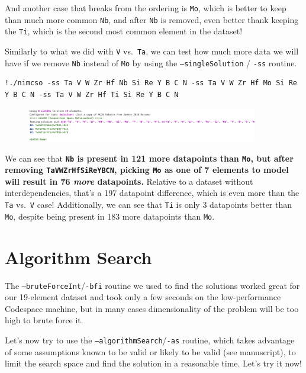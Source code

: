 And another case that breaks from the ordering is
\texttt{Mo}, which is better to keep than much more
common \texttt{Nb}, and after
\texttt{Nb} is removed, even better thank keeping the
\texttt{Ti}, which is the second most common element in
the dataset!

Similarly to what we did with \texttt{V}
vs.~\texttt{Ta}, we can test how much more data we will
have if we remove \texttt{Nb} instead of
\texttt{Mo} by using the
\texttt{--singleSolution} /
\texttt{-ss} routine.

\begin{verbatim}
!./nimcso -ss Ta V W Zr Hf Nb Si Re Y B C N -ss Ta V W Zr Hf Mo Si Re Y B C N -ss Ta V W Zr Hf Ti Si Re Y B C N
\end{verbatim}

\begin{figure}[H]
  \centering
  \includegraphics[width=0.9\textwidth]{nimcsotutorial/6.png}
\end{figure}

We can see that \textbf{\texttt{Nb} is present in 121
more datapoints than \texttt{Mo}, but after removing
\texttt{TaVWZrHfSiReYBCN}, picking
\texttt{Mo} as one of 7 elements to model will result
in 76 \emph{more} datapoints.} Relative to a dataset without
interdependencies, that's a 197 datapoint difference, which is even more
than the \texttt{Ta} vs.~\texttt{V}
case! Additionally, we can see that \texttt{Ti} is only
3 datapoints better than \texttt{Mo}, despite being
present in 183 more datapoints than \texttt{Mo}.

\hypertarget{algorithm-search}{%
\section{Algorithm Search}\label{nimcsotutorial:algorithm-search}}

The
\texttt{--bruteForceInt}/\texttt{-bfi}
routine we used to find the solutions worked great for our 19-element
dataset and took only a few seconds on the low-performance Codespace
machine, but in many cases dimensionality of the problem will be too
high to brute force it.

Let's now try to use the
\texttt{--algorithmSearch}/\texttt{-as}
routine, which takes advantage of some assumptions known to be valid or
likely to be valid (see manuscript), to limit the search space and find
the solution in a reasonable time. Let's try it now!


